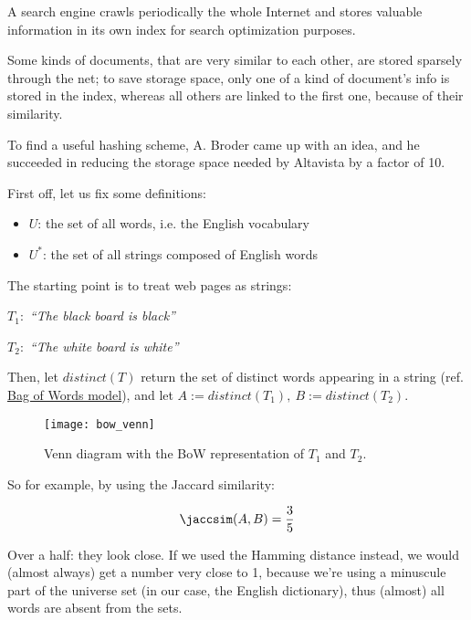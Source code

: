 	A search engine crawls periodically the whole Internet and stores valuable information in its own index for search optimization purposes.
	
    \begin{obs}
        Some kinds of documents, that are very similar to each other, are stored sparsely through the net; to save storage space, only one of a kind of document's info is stored in the index, whereas all others are linked to the first one, because of their similarity.
    \end{obs}
	
	To find a useful hashing scheme, A. Broder came up with an idea, and he succeeded in reducing the storage space needed by Altavista by a factor of 10.
    
	First off, let us fix some definitions:
	\begin{itemize}
	\item $U$: the set of all words, i.e. the English vocabulary
	\item $U^*$: the set of all strings composed of English words
	\end{itemize}
	
	The starting point is to treat web pages as strings:
	
	$T_1:$ \textit{``The black board is black''}
	
	$T_2:$ \textit{``The white board is white''}
	
	Then, let $distinct(T)$ return the set of distinct words appearing in a string (ref. \href{https://en.wikipedia.org/wiki/Bag-of-words_model}{Bag of Words model}), and let $A:=distinct(T_1),\ B:=distinct(T_2)$.
    
    \begin{figure}[h!]
        \centering
        \texttt{[image: bow\_venn]}
        \caption{Venn diagram with the BoW representation of $T_1$ and $T_2$.}
        \label{fig:bow_venn}
    \end{figure}
	
	So for example, by using the Jaccard similarity:
    
    \begin{equation}
    \jaccsim(A, B)= \frac{3}{5}
    \end{equation}
	
	Over a half: they look close. If we used the Hamming distance instead, we would (almost always) get a number very close to 1, because we're using a minuscule part of the universe set (in our case, the English dictionary), thus (almost) all words are absent from the sets.
	
